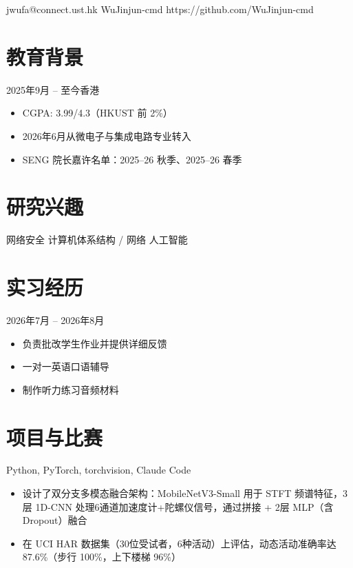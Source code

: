 \documentclass{common/resume}
\begin{document}
  {jwufa@connect.ust.hk}
  {WuJinjun-cmd}
  {https://github.com/WuJinjun-cmd}

\section{教育背景}

  {2025年9月 -- 至今}{香港}

\begin{itemize}
  \item CGPA: 3.99/4.3（HKUST 前 2\%）
  \item 2026年6月从微电子与集成电路专业转入
  \item SENG 院长嘉许名单：2025--26 秋季、2025--26 春季
\end{itemize}

\section{研究兴趣}

网络安全 \textbullet{} 计算机体系结构 / 网络 \textbullet{} 人工智能

\section{实习经历}

  {2026年7月 -- 2026年8月}{}

\begin{itemize}
  \item 负责批改学生作业并提供详细反馈
  \item 一对一英语口语辅导
  \item 制作听力练习音频材料
\end{itemize}

\section{项目与比赛}

  {Python, PyTorch, torchvision, Claude Code}

\begin{itemize}
  \item 设计了双分支多模态融合架构：MobileNetV3-Small 用于 STFT 频谱特征，3层 1D-CNN 处理6通道加速度计+陀螺仪信号，通过拼接 + 2层 MLP（含 Dropout）融合
  \item 在 UCI HAR 数据集（30位受试者，6种活动）上评估，动态活动准确率达 87.6\%（步行 100\%，上下楼梯 96\%）
\end{itemize}
\end{document}
